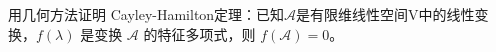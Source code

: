 \documentclass[lang=cn,12pt]{elegantbook}
\begin{document}
    

    
    

\begin{example}
    用几何方法证明 Cayley-Hamilton定理：已知$\mathcal{A}  $是有限维线性空间V中的线性变换，\(f(\lambda)\) 是变换 \(\mathcal{A}\) 的特征多项式，则 \(f(\mathcal{A}) = 0\)。
\end{example}
\end{document}
